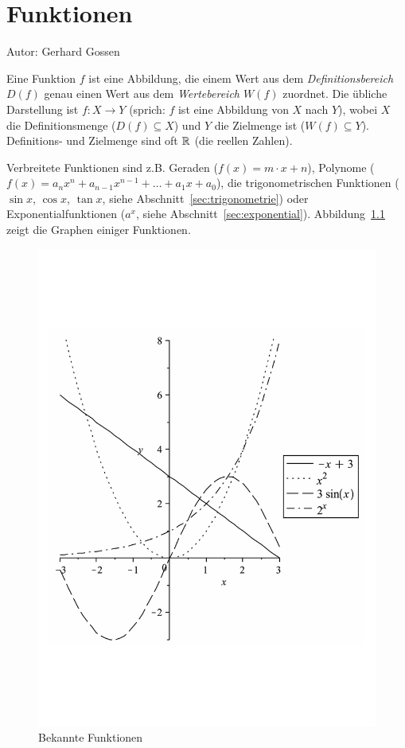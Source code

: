 \newcommand{\pitwo}{\frac{\pi}{2}}
\newcommand{\newpar}{\vspace{1em}\noindent}

\chapter{Funktionen}
\label{chap:funktionen}

Autor: Gerhard Gossen

\mbox{}\par
\noindent Eine Funktion $f$ ist eine Abbildung, die einem Wert aus dem \emph{Definitionsbereich $D(f)$} genau einen Wert aus dem \emph{Wertebereich $W(f)$} zuordnet. Die übliche Darstellung ist
$f : X \to Y$ (sprich: $f$ ist eine Abbildung von $X$ nach $Y$), wobei $X$ die Definitionsmenge ($D(f) \subseteq X$) und $Y$ die Zielmenge ist ($W(f) \subseteq Y$). Definitions- und Zielmenge sind oft $\mathbb{R}$ (die reellen Zahlen).

\noindent Verbreitete Funktionen sind z.B. Geraden ($f(x) = m\cdot x +n$), Polynome ($f(x) = a_n x^n + a_{n-1} x^{n-1}+\dots + a_1x+a_0$), die trigonometrischen Funktionen ($\sin x$, $\cos x$, $\tan x$, siehe Abschnitt~\ref{sec:trigonometrie}) oder Exponentialfunktionen ($a^x$, siehe Abschnitt~\ref{sec:exponential}). Abbildung~\ref{fig:funktionen} zeigt die Graphen einiger Funktionen.

\begin{figure}[bth]
\begin{center}
\includegraphics[width=.4\textwidth]{img/Funktionssammlung.pdf}
\end{center}
\caption{Bekannte Funktionen}
\label{fig:funktionen}
\end{figure} 

